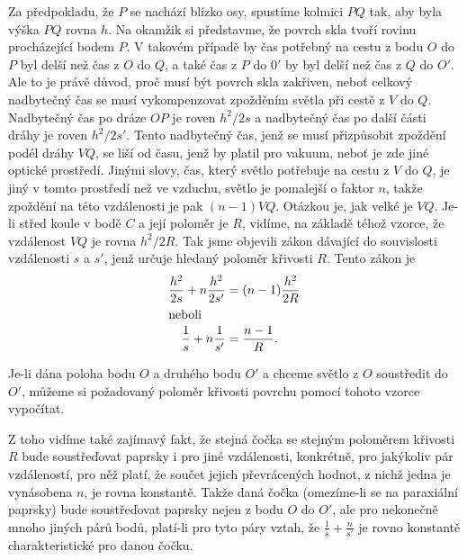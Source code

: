     Za předpokladu, že \(P\) se nachází blízko osy, spustíme kolmici \(PQ\) tak, aby byla výška 
    \(PQ\) rovna \(h\). Na okamžik si představme, že povrch skla tvoří rovinu procházející bodem 
    \(P\). V takovém případě by čas potřebný na cestu z bodu \(O\) do \(P\) byl delší než čas z 
    \(O\) do \(Q\), a také čas z \(P\) do \(0'\) by byl delší než čas z \(Q\) do \(O'\). Ale to je 
    právě důvod, proč musí být povrch skla zakřiven, neboť celkový nadbytečný čas se musí 
    vykompenzovat zpožděním světla při cestě z \(V\) do \(Q\). Nadbytečný čas po dráze \(OP\) je 
    roven \(h^2/2s\) a nadbytečný čas po další části dráhy je roven \(h^2/2s'\). Tento nadbytečný 
    čas, jenž se musí přizpůsobit zpoždění podél dráhy \(VQ\), se liší od času, jenž by platil pro 
    vakuum, neboť je zde jiné optické prostředí. Jinými slovy, čas, který světlo potřebuje na cestu 
    z \(V\) do \(Q\), je jiný v tomto prostředí než ve vzduchu, světlo je pomalejší o faktor \(n\), 
    takže zpoždění na této vzdálenosti je pak \((n-1)VQ\). Otázkou je, jak velké je \(VQ\). Je-li 
    střed koule v bodě \(C\) a její poloměr je \(R\), vidíme, na základě téhož vzorce, že 
    vzdálenost \(VQ\) je rovna \(h^2/2R\). Tak jsme objevili zákon dávající do souvislosti 
    vzdálenosti \(s\) a \(s'\), jenž určuje hledaný poloměr křivosti \(R\). Tento zákon je
    \begin{subequations}\label{fyz:eq360}
      \begin{align}
        \frac{h^2}{2s} + n\frac{h^2}{2s'} &= (n-1)\frac{h^2}{2R} \label{fyz:eq360a} \\
        \shortintertext{neboli}
        \frac{1}{s} + n\frac{1}{s'}       &= \frac{n-1}{R}.      \label{fyz:eq360b}
      \end{align}    
    \end{subequations}

    Je-li dána poloha bodu \(O\) a druhého bodu \(O'\) a chceme světlo z \(O\) soustředit do 
    \(O'\), můžeme si požadovaný poloměr křivosti povrchu pomocí tohoto vzorce vypočítat.
    
    Z toho vidíme také zajímavý fakt, že stejná čočka se stejným poloměrem křivosti \(R\) bude 
    soustřeďovat paprsky i pro jiné vzdálenosti, konkrétně, pro jakýkoliv pár vzdáleností, pro něž 
    platí, že součet jejich převrácených hodnot, z nichž jedna je vynásobena \(n\), je rovna 
    konstantě. Takže daná čočka (omezíme-li se na paraxiální paprsky) bude soustřeďovat paprsky 
    nejen z bodu \(O\) do \(O'\), ale pro nekonečně mnoho jiných párů bodů, platí-li pro tyto páry 
    vztah, že \(\frac{1}{s} + \frac{n}{s'}\) je rovno konstantě charakteristické pro danou čočku.
    
